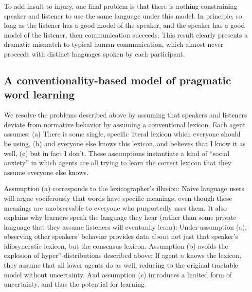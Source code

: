 \documentclass{article} %
\begin{document}
To add insult to injury, one final problem is that there is nothing
constraining speaker and listener to use the same language under this
model. In principle, so long as the listener has a good model of the
speaker, and the speaker has a good model of the listener, then
communication succeeds. This result clearly presents a dramatic
mismatch to typical human communication, which almost never proceeds
with distinct languages spoken by each participant.


\subsection{A conventionality-based model of pragmatic word learning}

We resolve the problems described above by assuming that speakers and
listeners deviate from normative behavior by assuming a conventional
lexicon.
Each agent assumes: (a) There is some single, specific literal lexicon
which everyone should be using, (b) and everyone else knows this
lexicon, and believes that I know it as well, (c) but in fact I
don't. These assumptions instantiate a kind of ``social anxiety'' in
which agents are all trying to learn the correct lexicon that they
assume everyone else knows.

Assumption (a) corresponds to the lexicographer's illusion: Naive
language users will argue vociferously that words have specific
meanings, even though these meanings are unobservable to everyone who
purportedly uses them. It also explains why learners speak the
language they hear (rather than some private language that they assume
listeners will eventually learn): Under assumption (a), observing
other speakers' behavior provides data about not just that speaker's
idiosyncratic lexicon, but the consensus lexicon. Assumption (b)
avoids the explosion of hyper$^n$-distributions described above: If
agent $n$ knows the lexicon, they assume that all lower agents do as
well, reducing to the original tractable model without
uncertainty. And assumption (c) introduces a limited form of
uncertainty, and thus the potential for learning.
\end{document}
